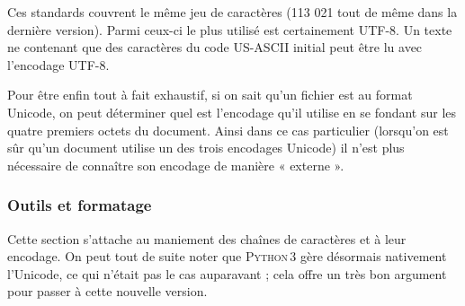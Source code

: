 Ces standards couvrent le même jeu de caractères (113 021 tout de même dans la dernière version). Parmi ceux-ci le plus utilisé est certainement UTF-8. Un texte ne contenant que des caractères du code US-ASCII initial peut être lu avec l'encodage UTF-8.

Pour être enfin tout à fait exhaustif, si on sait qu'un fichier est au format Unicode, on peut déterminer quel est l'encodage qu'il utilise en se fondant sur les quatre premiers octets du document. Ainsi dans ce cas particulier (lorsqu'on est sûr qu'un document utilise un des trois encodages Unicode) il n'est plus nécessaire de connaître son encodage de manière « externe ».

\subsubsection[Outils et formatage]{Outils et formatage}
\label{subsub:XI.1.1.2}

Cette section s'attache au maniement des chaînes de caractères et à leur encodage. On peut tout de suite noter que \textsc{Python\,3} gère désormais nativement l'Unicode, ce qui n'était pas le cas auparavant ; cela offre un très bon argument pour passer à cette nouvelle version.


